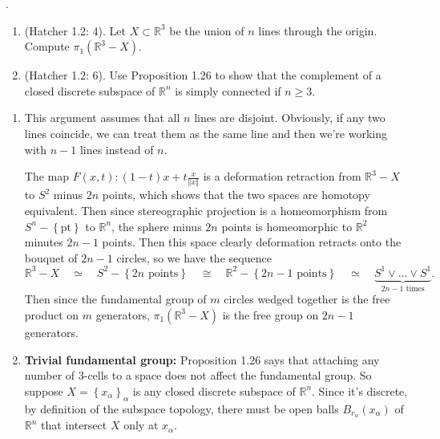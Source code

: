 \documentclass[twoside,10pt]{article}
\begin{document}
\newpage

\begin{exer}
	\color{white}.\color{black}
\begin{enumerate}
	\item (Hatcher 1.2: 4). Let $X \subset \mathbb{R}^3$ be the union of $n$ lines through the origin. Compute $\pi_1(\mathbb{R}^{3}-X)$.

	\item (Hatcher 1.2: 6). Use Proposition 1.26 to show that the complement of a closed discrete subspace of $\mathbb{R}^{n}$ is simply connected if $n \geq 3$.
\end{enumerate}
\end{exer}

\begin{enumerate}
	\item This argument assumes that all $n$ lines are disjoint. Obviously, if any two lines coincide, we can treat them as the same line and then we're working with $n-1$ lines instead of $n$.

		The map $F(x,t): (1-t)x + t \frac{x}{{\Vert{x}\Vert}} $ is a deformation retraction from $\mathbb{R}^{3}- X$ to $S^{2}$ minus $2n$ points, which shows that the two spaces are homotopy equivalent. Then since stereographic projection is a homeomorphism from $S^{n}-\left\{ \text{pt} \right\}$ to $\mathbb{R}^{n}$, the sphere minus $2n$ points is homeomorphic to $\mathbb{R}^{2}$ minutes $2n-1$ points. Then this space clearly deformation retracts onto the bouquet of $2n-1$ circles, so we have the sequence \[
			\mathbb{R}^{3}-X \quad\simeq\quad S^{2}- \left\{ 2n \text{ points} \right\} \quad\cong \quad \mathbb{R}^{2}- \left\{ 2n - 1 \text{ points} \right\} \quad\simeq\quad \underbrace{S^{1} \vee \dots \vee S^{1}}_{2n-1 \text{ times}} .
		\] 
		Then since the fundamental group of $m$ circles wedged together is the free product on $m$ generators, $\pi_1(\mathbb{R}^{3}-X)$ is the free group on $2n-1$ generators.

	\item \textbf{Trivial fundamental group:} Proposition 1.26 says that attaching any number of $3$-cells to a space does not affect the fundamental group. So suppose $X = \left\{ x_{\alpha} \right\}_{\alpha}$ is any closed discrete subspace of $\mathbb{R}^{n}$. Since it's discrete, by definition of the subspace topology, there must be open balls $B_{r_{\alpha}}(x_{\alpha})$ of $\mathbb{R}^{n}$ that intersect $X$ only at $x_{\alpha}$.


\end{enumerate}
\end{document}
